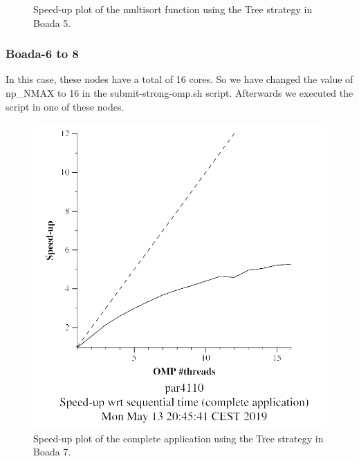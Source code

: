\documentclass[12pt, a4paper]{article}
\begin{document}
\begin{figure}[H]
\begin{minipage}[b]{0.4\linewidth}
  \caption{Speed-up plot of the multisort function using the Tree strategy in Boada 5.}
  \label{fig:mandel-omp-10000-strong-21-speedup}
\end{minipage}
\end{figure}

\subsubsection{Boada-6 to 8}

In this case, these nodes have a total of 16 cores. So we have changed the value of np\_NMAX to 16 in the submit-strong-omp.sh script. Afterwards we executed the script in one of these nodes.

\begin{figure}[H]
\centering
\begin{minipage}[b]{0.4\linewidth}
  \centering
  \includegraphics[scale=0.5]{./images/S2/multisort-omp-strong_boada-7_tree_complete_application}
  \caption{Speed-up plot of the complete application using the Tree strategy in Boada 7.}
  \label{fig:mandel-omp-10000-strong-21-time}
\end{minipage}%
\hspace{0.5cm}
\begin{minipage}[b]{0.4\linewidth}
  \centering

\end{minipage}
\end{figure}
\end{document}
